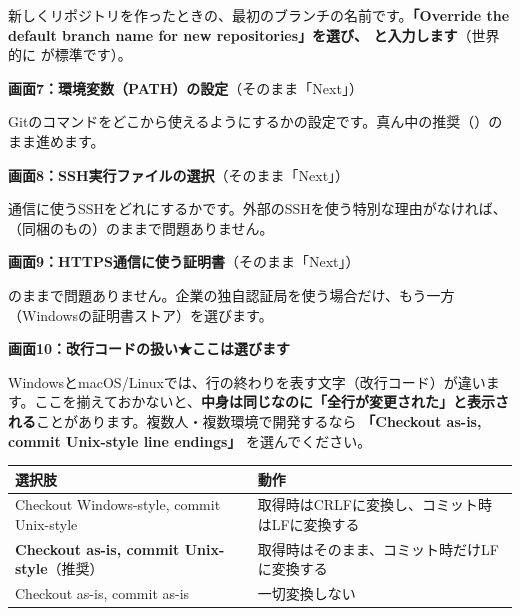 新しくリポジトリを作ったときの、最初のブランチの名前です。\textbf{「Override the default branch name for new repositories」を選び、 と入力します}（世界的に  が標準です）。

\medskip
\noindent\textbf{画面7：環境変数（PATH）の設定}（そのまま「Next」）

Gitのコマンドをどこから使えるようにするかの設定です。真ん中の推奨（）のまま進めます。

\medskip
\noindent\textbf{画面8：SSH実行ファイルの選択}（そのまま「Next」）

通信に使うSSHをどれにするかです。外部のSSHを使う特別な理由がなければ、（同梱のもの）のままで問題ありません。

\medskip
\noindent\textbf{画面9：HTTPS通信に使う証明書}（そのまま「Next」）

 のままで問題ありません。企業の独自認証局を使う場合だけ、もう一方（Windowsの証明書ストア）を選びます。

\medskip
\noindent\textbf{画面10：改行コードの扱い}\quad\textbf{★ここは選びます}

WindowsとmacOS/Linuxでは、行の終わりを表す文字（改行コード）が違います。ここを揃えておかないと、\textbf{中身は同じなのに「全行が変更された」と表示される}ことがあります。複数人・複数環境で開発するなら \textbf{「Checkout as-is, commit Unix-style line endings」} を選んでください。

\begin{center}
\begin{tabularx}{\linewidth}{@{}l X@{}}
\toprule
選択肢 & 動作 \\
\midrule
Checkout Windows-style, commit Unix-style & 取得時はCRLFに変換し、コミット時はLFに変換する \\
\textbf{Checkout as-is, commit Unix-style}（推奨） & 取得時はそのまま、コミット時だけLFに変換する \\
Checkout as-is, commit as-is & 一切変換しない \\
\bottomrule
\end{tabularx}
\end{center}


